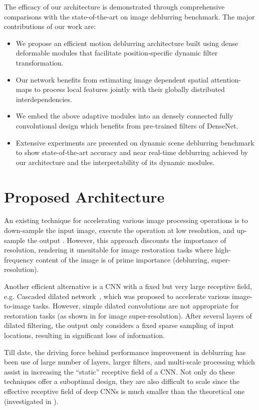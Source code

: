 \documentclass[letterpaper]{article} \usepackage{aaai20}  \usepackage{times}  \usepackage{helvet} \usepackage{courier}  \usepackage[hyphens]{url}  \usepackage{graphicx} \urlstyle{rm} \def\UrlFont{\rm}  \usepackage{graphicx}  \frenchspacing  \setlength{\pdfpagewidth}{8.5in}  \setlength{\pdfpageheight}{11in}
\begin{document}
The efficacy of our architecture is demonstrated through comprehensive comparisons with the state-of-the-art on image deblurring benchmark. The major contributions of our work are:
\begin{itemize}
\item We propose an efficient motion deblurring architecture built using dense deformable modules that facilitate position-specific dynamic filter transformation. 
\item Our network benefits from estimating image dependent spatial attention-maps to process local features jointly with their globally distributed interdependencies.
\item We embed the above adaptive modules into an densely connected fully convolutional design which benefits from pre-trained filters of DenseNet. 
\item Extensive experiments are presented on dynamic scene deblurring benchmark to show state-of-the-art accuracy and near real-time deblurring achieved by our architecture and the interpretability of its dynamic modules. 
\end{itemize}

\section{Proposed Architecture}

An existing technique for accelerating various image processing operations is to down-sample the input image, execute the operation at low resolution, and up-sample the output \cite{chen2016bilateral}. However, this approach discounts the importance of resolution, rendering it unsuitable for image restoration tasks where high-frequency content of the image is of prime importance (deblurring, super-resolution).

Another efficient alternative is a CNN with a fixed but very large receptive field, e.g. Cascaded dilated network~\cite{chen2017fast}, which was proposed to accelerate various image-to-image tasks. However, simple dilated convolutions are not appropriate for restoration tasks (as shown in \cite{liu2018multi} for image super-resolution). After several layers of dilated filtering, the output only considers a fixed sparse sampling of input locations, resulting in significant loss of information. 

Till date, the driving force behind performance improvement in deblurring has been use of large number of layers, larger filters, and multi-scale processing which assist in increasing the ``static'' receptive field of a CNN. Not only do these techniques offer a suboptimal design, they are also difficult to scale since the effective receptive field of deep CNNs is much smaller than the theoretical one (investigated in \cite{luo2016understanding}).
\end{document}
